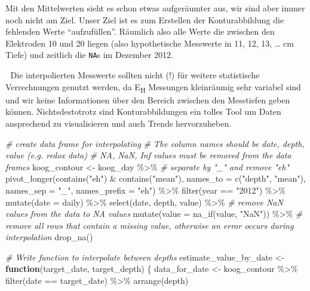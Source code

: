 \documentclass[
]{article}
\newenvironment{Shaded}{\begin{snugshade}}{\end{snugshade}}
\newcommand{\AttributeTok}[1]{\textcolor[rgb]{0.77,0.63,0.00}{#1}}
\newcommand{\CommentTok}[1]{\textcolor[rgb]{0.56,0.35,0.01}{\textit{#1}}}
\newcommand{\ControlFlowTok}[1]{\textcolor[rgb]{0.13,0.29,0.53}{\textbf{#1}}}
\newcommand{\FunctionTok}[1]{\textcolor[rgb]{0.00,0.00,0.00}{#1}}
\newcommand{\NormalTok}[1]{#1}
\newcommand{\OtherTok}[1]{\textcolor[rgb]{0.56,0.35,0.01}{#1}}
\newcommand{\SpecialCharTok}[1]{\textcolor[rgb]{0.00,0.00,0.00}{#1}}
\newcommand{\StringTok}[1]{\textcolor[rgb]{0.31,0.60,0.02}{#1}}
\begin{document}
Mit den Mittelwerten sieht es schon etwas aufgeräumter aus, wir sind aber immer noch nicht am Ziel. Unser Ziel ist es zum Erstellen der Konturabbildung die fehlenden Werte ``aufzufüllen''. Räumlich also alle Werte die zwischen den Elektroden 10 und 20 liegen (also hypothetische Messwerte in 11, 12, 13, \ldots{} cm Tiefe) und zeitlich die \texttt{NA}s im Dezember 2012.

🚨 Die interpolierten Messwerte sollten nicht (!) für weitere statistische Verrechnungen genutzt werden, da E\textsubscript{H} Messungen kleinräumig sehr variabel sind und wir keine Informationen über den Bereich zwischen den Messtiefen geben können. Nichtsdestotrotz sind Konturabbildungen ein tolles Tool um Daten ansprechend zu visualisieren und auch Trends hervorzuheben.

\begin{Shaded}
\begin{Highlighting}[]
\CommentTok{\# create data frame for interpolating}
\CommentTok{\# The column names should be date, depth, value (e.g. redox data)}
\CommentTok{\# NA, NaN, Inf values must be removed from the data frames}
\NormalTok{koog\_contour }\OtherTok{\textless{}{-}}\NormalTok{ koog\_day }\SpecialCharTok{\%\textgreater{}\%}
  \CommentTok{\# separate by "\_" and remove "eh"}
  \FunctionTok{pivot\_longer}\NormalTok{(}\FunctionTok{contains}\NormalTok{(}\StringTok{"eh"}\NormalTok{) }\SpecialCharTok{\&} \FunctionTok{contains}\NormalTok{(}\StringTok{"mean"}\NormalTok{), }\AttributeTok{names\_to =} \FunctionTok{c}\NormalTok{(}\StringTok{"depth"}\NormalTok{, }\StringTok{"mean"}\NormalTok{), }\AttributeTok{names\_sep =} \StringTok{"\_"}\NormalTok{, }\AttributeTok{names\_prefix =} \StringTok{"eh"}\NormalTok{) }\SpecialCharTok{\%\textgreater{}\%} 
  \FunctionTok{filter}\NormalTok{(year }\SpecialCharTok{==} \StringTok{"2012"}\NormalTok{) }\SpecialCharTok{\%\textgreater{}\%}
  \FunctionTok{mutate}\NormalTok{(}\AttributeTok{date =}\NormalTok{ daily) }\SpecialCharTok{\%\textgreater{}\%}
  \FunctionTok{select}\NormalTok{(date, depth, value) }\SpecialCharTok{\%\textgreater{}\%} 
  \CommentTok{\# remove NaN values from the data to NA values}
  \FunctionTok{mutate}\NormalTok{(}\AttributeTok{value =} \FunctionTok{na\_if}\NormalTok{(value, }\StringTok{"NaN"}\NormalTok{)) }\SpecialCharTok{\%\textgreater{}\%} 
  \CommentTok{\# remove all rows that contain a missing value, otherwise an error occurs during interpolation }
  \FunctionTok{drop\_na}\NormalTok{() }

\CommentTok{\# Write function to interpolate between depths }
\NormalTok{estimate\_value\_by\_date }\OtherTok{\textless{}{-}} \ControlFlowTok{function}\NormalTok{(target\_date, target\_depth) \{}
\NormalTok{  data\_for\_date }\OtherTok{\textless{}{-}}\NormalTok{ koog\_contour }\SpecialCharTok{\%\textgreater{}\%} 
    \FunctionTok{filter}\NormalTok{(date }\SpecialCharTok{==}\NormalTok{ target\_date) }\SpecialCharTok{\%\textgreater{}\%}
    \FunctionTok{arrange}\NormalTok{(depth)}
  

\end{Highlighting}
\end{Shaded}
\end{document}
